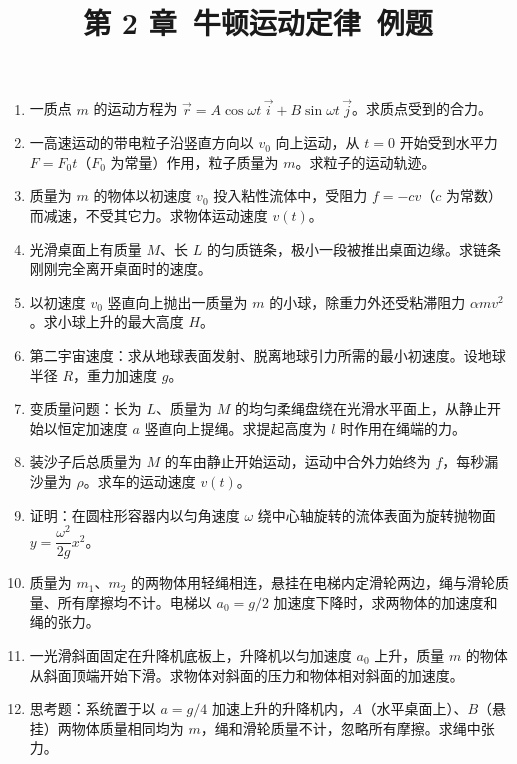 \documentclass[12pt]{article}
\title{第 2 章\ 牛顿运动定律\ 例题}
\author{}
\date{}
\begin{document}
\maketitle

\begin{enumerate}[label=\textbf{例\arabic*.}, leftmargin=*]

\item 一质点 $m$ 的运动方程为 $\vec{r} = A\cos\omega t\,\vec{i} + B\sin\omega t\,\vec{j}$。求质点受到的合力。

\item 一高速运动的带电粒子沿竖直方向以 $v_0$ 向上运动，从 $t = 0$ 开始受到水平力 $F = F_0 t$（$F_0$ 为常量）作用，粒子质量为 $m$。求粒子的运动轨迹。

\item 质量为 $m$ 的物体以初速度 $v_0$ 投入粘性流体中，受阻力 $f = -cv$（$c$ 为常数）而减速，不受其它力。求物体运动速度 $v(t)$。

\item 光滑桌面上有质量 $M$、长 $L$ 的匀质链条，极小一段被推出桌面边缘。求链条刚刚完全离开桌面时的速度。

\item 以初速度 $v_0$ 竖直向上抛出一质量为 $m$ 的小球，除重力外还受粘滞阻力 $\alpha m v^2$。求小球上升的最大高度 $H$。

\item 第二宇宙速度：求从地球表面发射、脱离地球引力所需的最小初速度。设地球半径 $R$，重力加速度 $g$。

\item 变质量问题：长为 $L$、质量为 $M$ 的均匀柔绳盘绕在光滑水平面上，从静止开始以恒定加速度 $a$ 竖直向上提绳。求提起高度为 $l$ 时作用在绳端的力。

\item 装沙子后总质量为 $M$ 的车由静止开始运动，运动中合外力始终为 $f$，每秒漏沙量为 $\rho$。求车的运动速度 $v(t)$。

\item 证明：在圆柱形容器内以匀角速度 $\omega$ 绕中心轴旋转的流体表面为旋转抛物面 $y = \dfrac{\omega^2}{2g}x^2$。

\item 质量为 $m_1$、$m_2$ 的两物体用轻绳相连，悬挂在电梯内定滑轮两边，绳与滑轮质量、所有摩擦均不计。电梯以 $a_0 = g/2$ 加速度下降时，求两物体的加速度和绳的张力。

\item 一光滑斜面固定在升降机底板上，升降机以匀加速度 $a_0$ 上升，质量 $m$ 的物体从斜面顶端开始下滑。求物体对斜面的压力和物体相对斜面的加速度。

\item 思考题：系统置于以 $a = g/4$ 加速上升的升降机内，$A$（水平桌面上）、$B$（悬挂）两物体质量相同均为 $m$，绳和滑轮质量不计，忽略所有摩擦。求绳中张力。

\end{enumerate}
\end{document}
